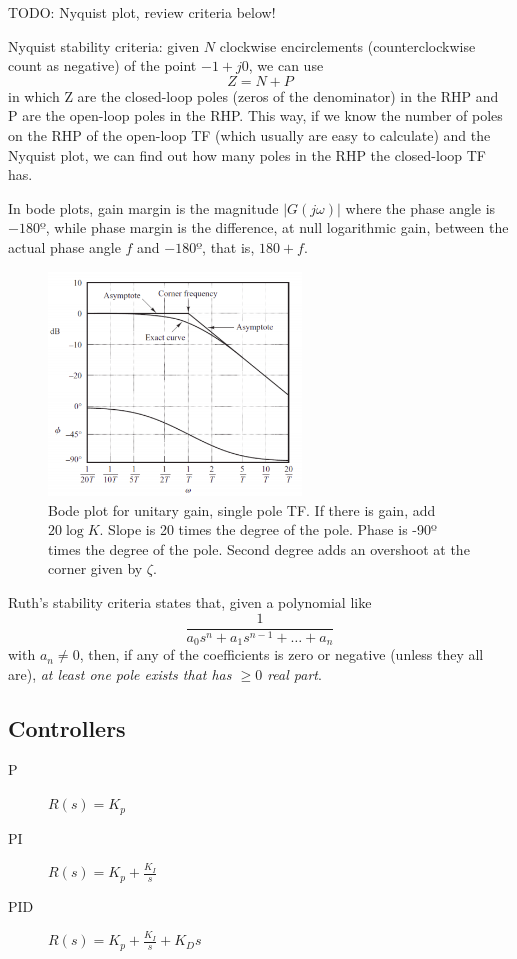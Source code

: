 \documentclass[a4paper]{report}
\begin{document}
TODO: Nyquist plot, review criteria below!

Nyquist stability criteria: given $N$ clockwise encirclements (counterclockwise count as negative) of the point $-1+j0$, we can use \[
Z = N + P
\] in which Z are the closed-loop poles (zeros of the denominator) in the RHP and P are the open-loop poles in the RHP. This way, if we know the number of poles on the RHP of the open-loop TF (which usually are easy to calculate) and the Nyquist plot, we can find out how many poles in the RHP the closed-loop TF has.

In bode plots, gain margin is the magnitude $|G(j\omega)|$ where the phase angle is $-180º$, while phase margin is the difference, at null logarithmic gain, between the actual phase angle $f$ and $-180º$, that is,  $180 + f$.

\begin{figure}[H]
    \centering
    \includegraphics[width=0.6\textwidth]{bode_plot.png}
    \caption{Bode plot for unitary gain, single pole TF. If there is gain, add $20\log K$. Slope is 20 times the degree of the pole. Phase is -90º times the degree of the pole. Second degree adds an overshoot at the corner given by $\zeta$.}
    \label{fig:bode_plot-png}
\end{figure}

Ruth's stability criteria states that, given a polynomial like \[
\frac{1}{a_0s^{n}+a_1s^{n-1}+\ldots+a_n}
\] with $a_n \neq 0$, then, if any of the coefficients is zero or negative (unless they all are), \emph{at least one pole exists that has $\ge 0$ real part}.
 \subsection*{Controllers}

\begin{description}
    \item[P] $R(s) = K_p$
    \item[PI] $R(s) = K_p + \frac{K_I}{s}$
    \item[PID] $R(s) = K_p + \frac{K_I}{s} + K_D s$
\end{description}
\end{document}
